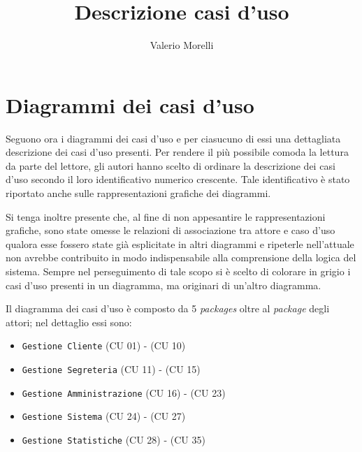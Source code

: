 \documentclass{article}
\title{Descrizione casi d'uso}
\author{Valerio Morelli}
\begin{document}
\section{Diagrammi dei casi d'uso}

\indent \indent Seguono ora i diagrammi dei casi d'uso e per ciasucuno di essi una dettagliata descrizione dei casi d'uso presenti. Per rendere il più possibile comoda la lettura da parte del lettore, gli autori hanno scelto di ordinare la descrizione dei casi d'uso secondo il loro identificativo numerico crescente. Tale identificativo è stato riportato anche sulle rappresentazioni grafiche dei diagrammi. 

\medskip

Si tenga inoltre presente che, al fine di non appesantire le rappresentazioni grafiche, sono state omesse le relazioni di associazione tra attore e caso d'uso qualora esse fossero state già esplicitate in altri diagrammi e ripeterle nell'attuale non avrebbe contribuito in modo indispensabile alla comprensione della logica del sistema. Sempre nel perseguimento di tale scopo si è scelto di colorare in grigio i casi d'uso presenti in un diagramma, ma originari di un'altro diagramma.

\medskip

 Il diagramma dei casi d'uso è composto da 5 \emph{packages} oltre al \emph{package} degli attori; nel dettaglio essi sono:

\medskip
\begin{itemize}[itemsep=0pt]
  \item \texttt{Gestione Cliente} (CU 01) - (CU 10)
  \item \texttt{Gestione Segreteria} (CU 11) - (CU 15)
  \item \texttt{Gestione Amministrazione} (CU 16) - (CU 23)
  \item \texttt{Gestione Sistema} (CU 24) - (CU 27)
  \item \texttt{Gestione Statistiche} (CU 28) - (CU 35)
\end{itemize}
\end{document}
